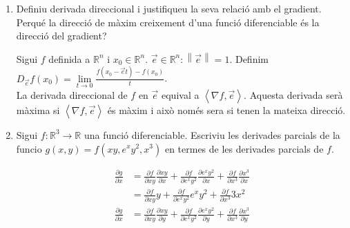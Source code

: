 \documentclass[a4paper, 12pt]{article}
\begin{document}
    \begin{exercici}
        \begin{enumerate}[label=\alph*)]
            \item Definiu derivada direccional i justifiqueu la seva relació amb el gradient. Perqué
            la direcció de màxim creixement d'una funció diferenciable és la direcció del gradient?
            \begin{solucio}
                Sigui $f$ definida a $\mathbb{R}^n$ i $x_0\in \mathbb{R}^n$. $\vec{e} \in \mathbb{R}^n: \left\lVert\vec{e}\right\rVert = 1$.
                Definim $D_{\vec{e}}f(x_0) = \lim\limits_{t\to0}\frac{f(x_0-\vec{e}t)-f(x_0)}{t}$.\\
                La derivada direccional de $f$ en $\vec{e}$ equival a $\left\langle\nabla f, \vec{e}\right\rangle$.
                Aquesta derivada serà màxima si $\left\langle\nabla f, \vec{e}\right\rangle$ és
                màxim i això només sera si tenen la mateixa direcció. 
            \end{solucio}
            \item Sigui $f: \mathbb{R}^3 \to \mathbb{R}$ una funció diferenciable. Escriviu les
            derivades parcials de la funcio $g(x, y) = f\left(xy, e^xy^2, x^3\right)$ en termes de
            les derivades parcials de $f$.\\
            \begin{solucio}
                \begin{displaymath}
                    \begin{split}
                        \frac{\partial g}{\partial x} &= \frac{\partial f}{\partial xy}\frac{\partial xy}{\partial x} + \frac{\partial f}{\partial e^xy^2}\frac{\partial e^xy^2}{\partial x} + \frac{\partial f}{\partial x^3}\frac{\partial x^3}{\partial x}\\
                        &= \frac{\partial f}{\partial xy}y + \frac{\partial f}{\partial e^xy^2}e^xy^2 + \frac{\partial f}{\partial x^3}3x^2
                    \end{split}
                \end{displaymath}
                \begin{displaymath}
                    \begin{split}
                        \frac{\partial g}{\partial x} &= \frac{\partial f}{\partial xy}\frac{\partial xy}{\partial y} + \frac{\partial f}{\partial e^xy^2}\frac{\partial e^xy^2}{\partial y} + \frac{\partial f}{\partial x^3}\frac{\partial x^3}{\partial y}\\

\end{split}
\end{displaymath}
\end{solucio}
\end{enumerate}
\end{exercici}
\end{document}
